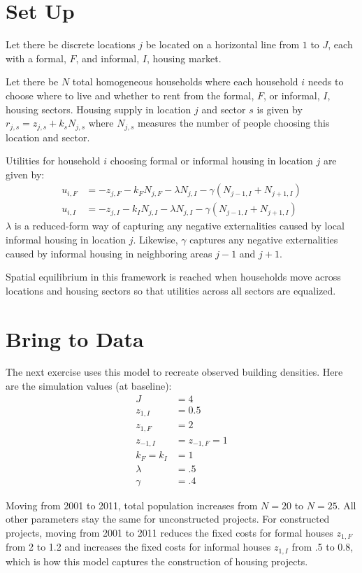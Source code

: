 \documentclass[12pt]{article}
\begin{document}
{}

\section{Set Up}
Let there be discrete locations $j$ be located on a horizontal line from $1$ to $J$, each with a formal, $F$, and informal, $I$, housing market.  

Let there be $N$ total homogeneous households where each household $i$ needs to choose where to live and whether to rent from the formal, $F$, or informal, $I$, housing sectors.  Housing supply in location $j$ and sector $s$ is given by $r_{j,s}=z_{j,s}+k_s N_{j,s}$ where $N_{j,s}$ measures the number of people choosing this location and sector.


Utilities for household $i$ choosing formal or informal housing in location $j$ are given by:
\begin{align*}
u_{i,F}   &= - z_{j,F}  - k_F N_{j,F}  - \lambda N_{j,I} - \gamma (N_{j-1,I}+N_{j+1,I})  \\
u_{i,I}   &= - z_{j,I}  - k_I N_{j,I}  - \lambda N_{j,I} - \gamma (N_{j-1,I}+N_{j+1,I}) 
\end{align*}
$\lambda$ is a reduced-form way of capturing any negative externalities caused by local informal housing in location $j$.  Likewise, $\gamma$ captures any negative externalities caused by informal housing in neighboring areas $j-1$ and $j+1$.

Spatial equilibrium in this framework is reached when households move across locations and housing sectors so that utilities across all sectors are equalized.

\section{Bring to Data}
The next exercise uses this model to recreate observed building densities.  Here are the simulation values (at baseline):
\begin{align*}
J &= 4 \\
z_{1,I} &= 0.5 \\
z_{1,F} &= 2 \\
z_{-1,I} &= z_{-1,F} = 1 \\
k_{F} = k_{I} &= 1  \\
\lambda &= .5 \\
\gamma &= .4
\end{align*}

Moving from 2001 to 2011, total population increases from $N=20$ to $N=25$.  All other parameters stay the same for unconstructed projects.  For constructed projects, moving from 2001 to 2011 reduces the fixed costs for formal houses $z_{1,F}$ from 2 to 1.2 and increases the fixed costs for informal houses $z_{1,I}$ from .5 to 0.8, which is how this model captures the construction of housing projects.
\end{document}
